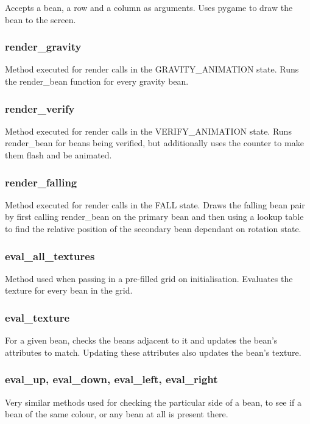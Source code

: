 \documentclass{report}
\begin{document}
Accepts a bean, a row and a column as arguments. Uses pygame to draw the bean to the screen.

\subsubsection{render\_gravity}

Method executed for render calls in the GRAVITY\_ANIMATION state. Runs the render\_bean function for every gravity bean.

\subsubsection{render\_verify}

Method executed for render calls in the VERIFY\_ANIMATION state. Runs render\_bean for beans being verified, but additionally uses the counter to make them flash and be animated.

\subsubsection{render\_falling}

Method executed for render calls in the FALL state. Draws the falling bean pair by first calling render\_bean on the primary bean and then using a lookup table to find the relative position of the secondary bean dependant on rotation state.

\subsubsection{eval\_all\_textures}

Method used when passing in a pre-filled grid on initialisation. Evaluates the texture for every bean in the grid.

\subsubsection{eval\_texture}

For a given bean, checks the beans adjacent to it and updates the bean's attributes to match. Updating these attributes also updates the bean's texture.

\subsubsection{eval\_up, eval\_down, eval\_left, eval\_right}

Very similar methods used for checking the particular side of a bean, to see if a bean of the same colour, or any bean at all is present there.
\end{document}
